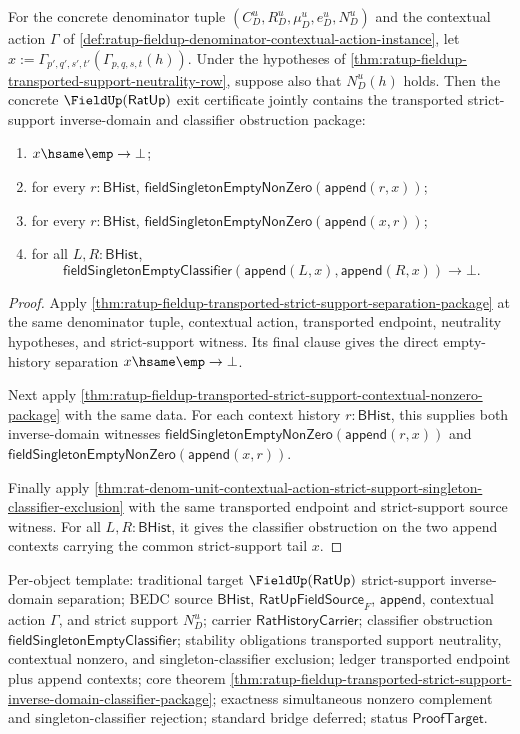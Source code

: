 \begin{theorem}
\label{thm:ratup-fieldup-transported-strict-support-inverse-domain-classifier-package}
For the concrete denominator tuple $(C_D^u,R_D^u,\mu_D^u,e_D^u,N_D^u)$ and the
contextual action $\Gamma$ of
\autoref{def:ratup-fieldup-denominator-contextual-action-instance}, let
$x:=\Gamma_{p',q',s',t'}(\Gamma_{p,q,s,t}(h))$. Under the hypotheses of
\autoref{thm:ratup-fieldup-transported-support-neutrality-row}, suppose also
that $N_D^u(h)$ holds. Then the concrete $\FieldUp(\mathsf{RatUp})$ exit
certificate jointly contains the transported strict-support inverse-domain and
classifier obstruction package:
\begin{enumerate}
  \item $x\hsame\emp\to\bot$;
  \item for every $r:\mathsf{BHist}$,
  $\mathsf{fieldSingletonEmptyNonZero}(\mathsf{append}(r,x))$;
  \item for every $r:\mathsf{BHist}$,
  $\mathsf{fieldSingletonEmptyNonZero}(\mathsf{append}(x,r))$;
  \item for all $L,R:\mathsf{BHist}$,
  $$
  \mathsf{fieldSingletonEmptyClassifier}(\mathsf{append}(L,x),\mathsf{append}(R,x))
  \to\bot.
  $$
\end{enumerate}
\end{theorem}
\begin{proof}
Apply
\autoref{thm:ratup-fieldup-transported-strict-support-separation-package} at the
same denominator tuple, contextual action, transported endpoint, neutrality
hypotheses, and strict-support witness. Its final clause gives the direct
empty-history separation $x\hsame\emp\to\bot$.

Next apply
\autoref{thm:ratup-fieldup-transported-strict-support-contextual-nonzero-package}
with the same data. For each context history $r:\mathsf{BHist}$, this supplies
both inverse-domain witnesses
$\mathsf{fieldSingletonEmptyNonZero}(\mathsf{append}(r,x))$ and
$\mathsf{fieldSingletonEmptyNonZero}(\mathsf{append}(x,r))$.

Finally apply
\autoref{thm:rat-denom-unit-contextual-action-strict-support-singleton-classifier-exclusion}
with the same transported endpoint and strict-support source witness. For all
$L,R:\mathsf{BHist}$, it gives the classifier obstruction on the two append
contexts carrying the common strict-support tail $x$.
\end{proof}

Per-object template: traditional target $\FieldUp(\mathsf{RatUp})$
strict-support inverse-domain separation; BEDC source $\mathsf{BHist}$,
$\mathsf{RatUpFieldSource}_F$, $\mathsf{append}$, contextual action $\Gamma$,
and strict support $N_D^u$; carrier $\mathsf{RatHistoryCarrier}$; classifier
obstruction $\mathsf{fieldSingletonEmptyClassifier}$; stability obligations
transported support neutrality, contextual nonzero, and singleton-classifier
exclusion; ledger transported endpoint plus append contexts; core theorem
\autoref{thm:ratup-fieldup-transported-strict-support-inverse-domain-classifier-package};
exactness simultaneous nonzero complement and singleton-classifier rejection;
standard bridge deferred; status $\mathsf{ProofTarget}$.

